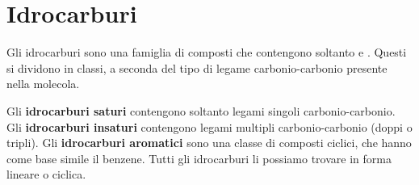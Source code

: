 \chapter*{Idrocarburi}

Gli idrocarburi sono una famiglia di composti che contengono soltanto  e . Questi si dividono in classi, a seconda del tipo di legame carbonio-carbonio presente nella molecola.

Gli \textbf{idrocarburi saturi} contengono soltanto legami singoli carbonio-carbonio. Gli \textbf{idrocarburi insaturi} contengono legami multipli carbonio-carbonio (doppi o tripli). Gli \textbf{idrocarburi aromatici} sono una classe di composti ciclici, che hanno come base simile il benzene.
Tutti gli idrocarburi li possiamo trovare in forma lineare o ciclica.

